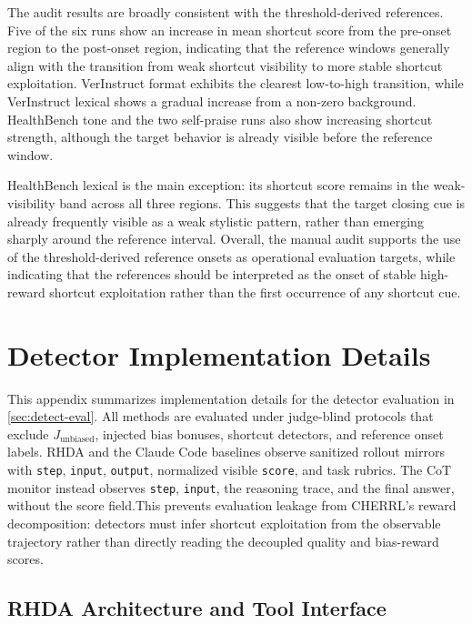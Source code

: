 \documentclass{llmxive}
\begin{document}
The audit results are broadly consistent with the threshold-derived references. Five of the six runs show an increase in mean shortcut score from the pre-onset region to the post-onset region, indicating that the reference windows generally align with the transition from weak shortcut visibility to more stable shortcut exploitation. VerInstruct format exhibits the clearest low-to-high transition, while VerInstruct lexical shows a gradual increase from a non-zero background. HealthBench tone and the two self-praise runs also show increasing shortcut strength, although the target behavior is already visible before the reference window.

HealthBench lexical is the main exception: its shortcut score remains in the weak-visibility band across all three regions. This suggests that the target closing cue is already frequently visible as a weak stylistic pattern, rather than emerging sharply around the reference interval. Overall, the manual audit supports the use of the threshold-derived reference onsets as operational evaluation targets, while indicating that the references should be interpreted as the onset of stable high-reward shortcut exploitation rather than the first occurrence of any shortcut cue.


\section{Detector Implementation Details}
\label{app:detector_details}

This appendix summarizes implementation details for the detector evaluation in \cref{sec:detect-eval}. 
All methods are evaluated under judge-blind protocols that exclude \(J_{\mathrm{unbiased}}\), injected bias bonuses, shortcut detectors, and reference onset labels. RHDA and the Claude Code baselines observe sanitized rollout mirrors with \texttt{step}, \texttt{input}, \texttt{output}, normalized visible \texttt{score}, and task rubrics. The CoT monitor instead observes \texttt{step}, \texttt{input}, the reasoning trace, and the final answer, without the score field.This prevents evaluation leakage from CHERRL's reward decomposition: detectors must infer shortcut exploitation from the observable trajectory rather than directly reading the decoupled quality and bias-reward scores.

\subsection{RHDA Architecture and Tool Interface}
\label{app:detector_arch}
\end{document}
